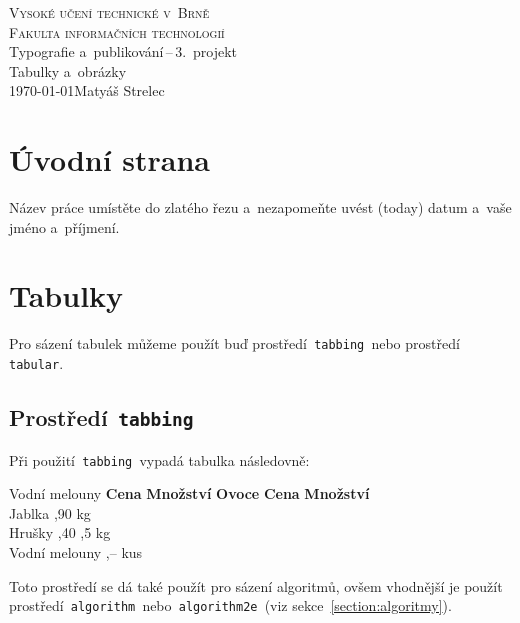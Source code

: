 \documentclass[a4paper, 11pt]{article}
\begin{document}
\begin{titlepage}
    \begin{center}
		{\Huge{\textsc{Vysoké učení technické v~Brně}}\\
        \huge{\textsc{Fakulta informačních technologií}}\\}
		\LARGE{Typografie a~publikování\,{}--\,{}3.\ projekt}\\
        \Huge{Tabulky a~obrázky\\}
        {\Large{\today \hfill Matyáš Strelec}}
	\end{center}
\end{titlepage}

\pagebreak

\section{Úvodní strana}
Název práce umístěte do zlatého řezu a~nezapomeňte uvést  (today) datum a~vaše jméno a~příjmení.

\section{Tabulky}
Pro sázení tabulek můžeme použít buď prostředí\texttt{ tabbing }nebo prostředí\texttt{ tabular}.

\subsection{Prostředí\texttt{ tabbing }}
Při použití\texttt{ tabbing }vypadá tabulka následovně:
\begin{tabbing}
    Vodní melouny \quad	\= \textbf{Cena} \quad	\= \textbf{Množství}	\kill
    \textbf{Ovoce}		\> \textbf{Cena}		\> \textbf{Množství}	\\
    Jablka				,90				 kg					\\
    Hrušky				,40				,5 kg				\\
    Vodní melouny		,--				 kus				\\
\end{tabbing}
Toto prostředí se dá také použít pro sázení algoritmů, ovšem vhodnější je použít
prostředí\texttt{ algorithm }nebo\texttt{ algorithm2e }(viz sekce~\ref{section:algoritmy}).
\end{document}
